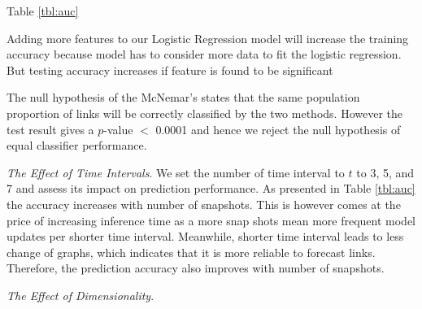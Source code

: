 Table \ref{tbl:auc}



Adding more features to our Logistic Regression model will increase the training accuracy because model has to consider more data to fit the logistic regression. But testing accuracy increases if feature is found to be significant

The null hypothesis of the McNemar's states that the same population proportion of links will be correctly classified by the two methods. However the test result gives a $p$-value $<$ 0.0001 and hence we reject the null hypothesis of equal classifier performance.




%    
%    
%
    
    


\textit{The Effect of Time Intervals}. We set the number of time interval to $t$ to 3, 5, and 7 and assess its impact on prediction performance. As presented in Table \ref{tbl:auc} the accuracy increases with number of snapshots. This is however comes at the price of increasing inference time as a more snap shots mean more frequent model updates per shorter time interval. Meanwhile, shorter time interval leads to less change of graphs, which indicates that it is more reliable to forecast links. Therefore, the prediction accuracy also improves with number of snapshots.

\textit{The Effect of Dimensionality}.

